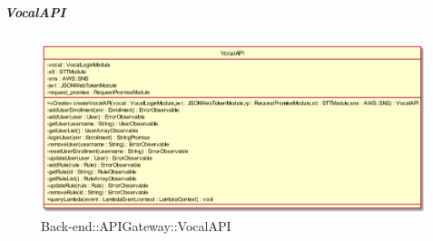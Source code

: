 \hypertarget{VocalAPI_label}{\subparagraph{VocalAPI}}
\begin{figure}[h]
	\centering
	\includegraphics[scale=1,width=\textwidth,height=\textheight,keepaspectratio]{images/ClassVocalAPI.png}
	\caption{Back-end::APIGateway::VocalAPI}
\end{figure}
